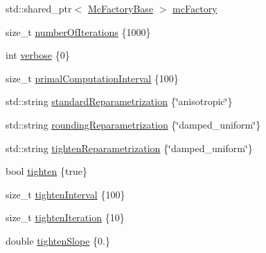 \begin{DoxyCompactItemize}
\item 
std\+::shared\+\_\+ptr$<$ \hyperlink{classnifty_1_1graph_1_1optimization_1_1multicut_1_1MulticutMp_aa5682a6987d5ab24a46a3eafc59f12c4}{Mc\+Factory\+Base} $>$ \hyperlink{structnifty_1_1graph_1_1optimization_1_1multicut_1_1MulticutMp_1_1Settings_a9490b9bbb3b5bf9dd5fee8dba91bf64e}{mc\+Factory}
\item 
size\+\_\+t \hyperlink{structnifty_1_1graph_1_1optimization_1_1multicut_1_1MulticutMp_1_1Settings_aeb23c962566ca613f6d5f3f5edbb6632}{number\+Of\+Iterations} \{1000\}
\item 
int \hyperlink{structnifty_1_1graph_1_1optimization_1_1multicut_1_1MulticutMp_1_1Settings_a3f5049f0159674f4c6e014c53243a17f}{verbose} \{0\}
\item 
size\+\_\+t \hyperlink{structnifty_1_1graph_1_1optimization_1_1multicut_1_1MulticutMp_1_1Settings_aa50f158589f0eb51369eeb43f1cc3551}{primal\+Computation\+Interval} \{100\}
\item 
std\+::string \hyperlink{structnifty_1_1graph_1_1optimization_1_1multicut_1_1MulticutMp_1_1Settings_a9677081677b506289374dad4093504b8}{standard\+Reparametrization} \{\char`\"{}anisotropic\char`\"{}\}
\item 
std\+::string \hyperlink{structnifty_1_1graph_1_1optimization_1_1multicut_1_1MulticutMp_1_1Settings_ac1c5346bd036a0874f1efce9a292cf4a}{rounding\+Reparametrization} \{\char`\"{}damped\+\_\+uniform\char`\"{}\}
\item 
std\+::string \hyperlink{structnifty_1_1graph_1_1optimization_1_1multicut_1_1MulticutMp_1_1Settings_a5952e1e0d9a333628a093e241161dc10}{tighten\+Reparametrization} \{\char`\"{}damped\+\_\+uniform\char`\"{}\}
\item 
bool \hyperlink{structnifty_1_1graph_1_1optimization_1_1multicut_1_1MulticutMp_1_1Settings_ae41d8c217eac7770d45cccfc5c5a7197}{tighten} \{true\}
\item 
size\+\_\+t \hyperlink{structnifty_1_1graph_1_1optimization_1_1multicut_1_1MulticutMp_1_1Settings_abac7973593835dacdbd6af619073e2f3}{tighten\+Interval} \{100\}
\item 
size\+\_\+t \hyperlink{structnifty_1_1graph_1_1optimization_1_1multicut_1_1MulticutMp_1_1Settings_a5436760fa67068d6e8590a5ee3d2935e}{tighten\+Iteration} \{10\}
\item 
double \hyperlink{structnifty_1_1graph_1_1optimization_1_1multicut_1_1MulticutMp_1_1Settings_abe72a4a8f0cf05616cb29495f5d5a12e}{tighten\+Slope} \{0.\}
\item 

\end{DoxyCompactItemize}
